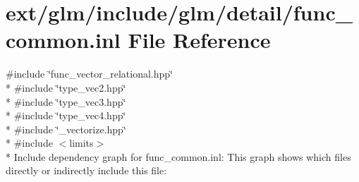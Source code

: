 \hypertarget{func__common_8inl}{\section{ext/glm/include/glm/detail/func\-\_\-common.inl File Reference}
\label{func__common_8inl}
}
{\ttfamily \#include \char`\"{}func\-\_\-vector\-\_\-relational.\-hpp\char`\"{}}\\*
{\ttfamily \#include \char`\"{}type\-\_\-vec2.\-hpp\char`\"{}}\\*
{\ttfamily \#include \char`\"{}type\-\_\-vec3.\-hpp\char`\"{}}\\*
{\ttfamily \#include \char`\"{}type\-\_\-vec4.\-hpp\char`\"{}}\\*
{\ttfamily \#include \char`\"{}\-\_\-vectorize.\-hpp\char`\"{}}\\*
{\ttfamily \#include $<$limits$>$}\\*
Include dependency graph for func\-\_\-common.\-inl\-:
This graph shows which files directly or indirectly include this file\-:
